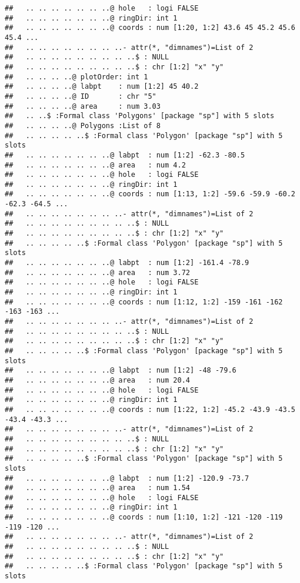 \documentclass[]{article}
\begin{document}
\begin{verbatim}
##   .. .. .. .. .. .. ..@ hole   : logi FALSE
##   .. .. .. .. .. .. ..@ ringDir: int 1
##   .. .. .. .. .. .. ..@ coords : num [1:20, 1:2] 43.6 45 45.2 45.6 45.4 ...
##   .. .. .. .. .. .. .. ..- attr(*, "dimnames")=List of 2
##   .. .. .. .. .. .. .. .. ..$ : NULL
##   .. .. .. .. .. .. .. .. ..$ : chr [1:2] "x" "y"
##   .. .. .. ..@ plotOrder: int 1
##   .. .. .. ..@ labpt    : num [1:2] 45 40.2
##   .. .. .. ..@ ID       : chr "5"
##   .. .. .. ..@ area     : num 3.03
##   .. ..$ :Formal class 'Polygons' [package "sp"] with 5 slots
##   .. .. .. ..@ Polygons :List of 8
##   .. .. .. .. ..$ :Formal class 'Polygon' [package "sp"] with 5 slots
##   .. .. .. .. .. .. ..@ labpt  : num [1:2] -62.3 -80.5
##   .. .. .. .. .. .. ..@ area   : num 4.2
##   .. .. .. .. .. .. ..@ hole   : logi FALSE
##   .. .. .. .. .. .. ..@ ringDir: int 1
##   .. .. .. .. .. .. ..@ coords : num [1:13, 1:2] -59.6 -59.9 -60.2 -62.3 -64.5 ...
##   .. .. .. .. .. .. .. ..- attr(*, "dimnames")=List of 2
##   .. .. .. .. .. .. .. .. ..$ : NULL
##   .. .. .. .. .. .. .. .. ..$ : chr [1:2] "x" "y"
##   .. .. .. .. ..$ :Formal class 'Polygon' [package "sp"] with 5 slots
##   .. .. .. .. .. .. ..@ labpt  : num [1:2] -161.4 -78.9
##   .. .. .. .. .. .. ..@ area   : num 3.72
##   .. .. .. .. .. .. ..@ hole   : logi FALSE
##   .. .. .. .. .. .. ..@ ringDir: int 1
##   .. .. .. .. .. .. ..@ coords : num [1:12, 1:2] -159 -161 -162 -163 -163 ...
##   .. .. .. .. .. .. .. ..- attr(*, "dimnames")=List of 2
##   .. .. .. .. .. .. .. .. ..$ : NULL
##   .. .. .. .. .. .. .. .. ..$ : chr [1:2] "x" "y"
##   .. .. .. .. ..$ :Formal class 'Polygon' [package "sp"] with 5 slots
##   .. .. .. .. .. .. ..@ labpt  : num [1:2] -48 -79.6
##   .. .. .. .. .. .. ..@ area   : num 20.4
##   .. .. .. .. .. .. ..@ hole   : logi FALSE
##   .. .. .. .. .. .. ..@ ringDir: int 1
##   .. .. .. .. .. .. ..@ coords : num [1:22, 1:2] -45.2 -43.9 -43.5 -43.4 -43.3 ...
##   .. .. .. .. .. .. .. ..- attr(*, "dimnames")=List of 2
##   .. .. .. .. .. .. .. .. ..$ : NULL
##   .. .. .. .. .. .. .. .. ..$ : chr [1:2] "x" "y"
##   .. .. .. .. ..$ :Formal class 'Polygon' [package "sp"] with 5 slots
##   .. .. .. .. .. .. ..@ labpt  : num [1:2] -120.9 -73.7
##   .. .. .. .. .. .. ..@ area   : num 1.54
##   .. .. .. .. .. .. ..@ hole   : logi FALSE
##   .. .. .. .. .. .. ..@ ringDir: int 1
##   .. .. .. .. .. .. ..@ coords : num [1:10, 1:2] -121 -120 -119 -119 -120 ...
##   .. .. .. .. .. .. .. ..- attr(*, "dimnames")=List of 2
##   .. .. .. .. .. .. .. .. ..$ : NULL
##   .. .. .. .. .. .. .. .. ..$ : chr [1:2] "x" "y"
##   .. .. .. .. ..$ :Formal class 'Polygon' [package "sp"] with 5 slots

\end{verbatim}
\end{document}
